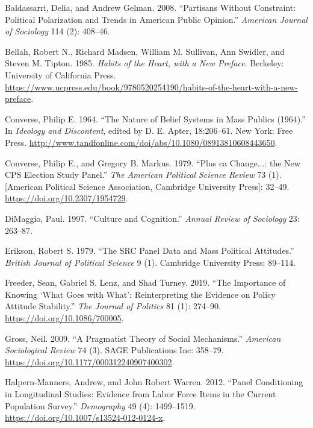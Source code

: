 \documentclass[12pt,]{article}
\begin{document}
\leavevmode\hypertarget{ref-baldassarri2008}{}%
Baldassarri, Delia, and Andrew Gelman. 2008. ``Partisans Without Constraint: Political Polarization and Trends in American Public Opinion.'' \emph{American Journal of Sociology} 114 (2): 408--46.

\leavevmode\hypertarget{ref-bellah1985}{}%
Bellah, Robert N., Richard Madsen, William M. Sullivan, Ann Swidler, and Steven M. Tipton. 1985. \emph{Habits of the Heart, with a New Preface}. Berkeley: University of California Press. \url{https://www.ucpress.edu/book/9780520254190/habits-of-the-heart-with-a-new-preface}.

\leavevmode\hypertarget{ref-converse1964}{}%
Converse, Philip E. 1964. ``The Nature of Belief Systems in Mass Publics (1964).'' In \emph{Ideology and Discontent}, edited by D. E. Apter, 18:206--61. New York: Free Press. \url{http://www.tandfonline.com/doi/abs/10.1080/08913810608443650}.

\leavevmode\hypertarget{ref-converse1979}{}%
Converse, Philip E., and Gregory B. Markus. 1979. ``Plus ca Change...: the New CPS Election Study Panel.'' \emph{The American Political Science Review} 73 (1). {[}American Political Science Association, Cambridge University Press{]}: 32--49. \url{https://doi.org/10.2307/1954729}.

\leavevmode\hypertarget{ref-dimaggio1997}{}%
DiMaggio, Paul. 1997. ``Culture and Cognition.'' \emph{Annual Review of Sociology} 23: 263--87.

\leavevmode\hypertarget{ref-erikson1979}{}%
Erikson, Robert S. 1979. ``The SRC Panel Data and Mass Political Attitudes.'' \emph{British Journal of Political Science} 9 (1). Cambridge University Press: 89--114.

\leavevmode\hypertarget{ref-freeder2019}{}%
Freeder, Sean, Gabriel S. Lenz, and Shad Turney. 2019. ``The Importance of Knowing `What Goes with What': Reinterpreting the Evidence on Policy Attitude Stability.'' \emph{The Journal of Politics} 81 (1): 274--90. \url{https://doi.org/10.1086/700005}.

\leavevmode\hypertarget{ref-gross2009}{}%
Gross, Neil. 2009. ``A Pragmatist Theory of Social Mechanisms.'' \emph{American Sociological Review} 74 (3). SAGE Publications Inc: 358--79. \url{https://doi.org/10.1177/000312240907400302}.

\leavevmode\hypertarget{ref-halpernmanners2012}{}%
Halpern-Manners, Andrew, and John Robert Warren. 2012. ``Panel Conditioning in Longitudinal Studies: Evidence from Labor Force Items in the Current Population Survey.'' \emph{Demography} 49 (4): 1499--1519. \url{https://doi.org/10.1007/s13524-012-0124-x}.
\end{document}
